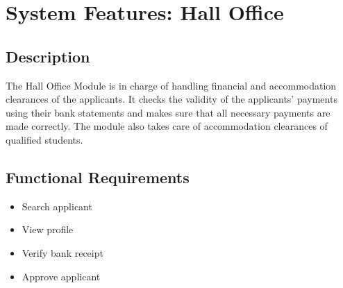 \section{System Features: Hall Office}

\subsection{Description}
The Hall Office Module is in charge of handling financial and accommodation clearances of the applicants. It checks the validity of the applicants' payments using their bank statements and makes sure that all necessary payments are made correctly. The module also takes care of accommodation clearances of qualified students.

\subsection{Functional Requirements}

\begin{itemize}
    \item Search applicant
    \item View profile
    \item Verify bank receipt
    \item Approve applicant
\end{itemize}